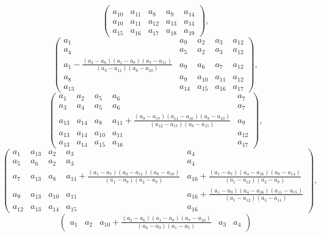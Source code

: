 \documentclass{article}
\begin{document}
\begin{enumerate}[1.]
\[\begin{pmatrix}
\\
 a_{10} & a_{11} & a_{8} & a_{9} & a_{14} 
\\
 a_{10} & a_{11} & a_{12} & a_{13} & a_{14} 
\\
 a_{15} & a_{16} & a_{17} & a_{18} & a_{19} 
\end{pmatrix},
\]
\[
\begin{pmatrix}
  a_{1} & a_{9} & a_{2} & a_{3} & a_{12} 
\\
 a_{4} & a_{5} & a_{2} & a_{3} & a_{12} 
\\
 a_{1}-\frac{\left(a_{2}-a_{6}\right) \left(a_{1}-a_{8}\right) \left(a_{7}-a_{11}\right)}{\left(a_{3}-a_{11}\right) \left(a_{6}-a_{10}\right)} & a_{9} & a_{6} & a_{7} & a_{12} 
\\
 a_{8} & a_{9} & a_{10} & a_{11} & a_{12} 
\\
 a_{13} & a_{14} & a_{15} & a_{16} & a_{17} 
\end{pmatrix},
\]
\[
\begin{pmatrix}
a_{1} & a_{2} & a_{5} & a_{6} & a_{7} 
\\
 a_{3} & a_{4} & a_{5} & a_{6} & a_{7} 
\\
 a_{13} & a_{14} & a_{8} & a_{11}+\frac{\left(a_{9}-a_{17}\right) \left(a_{11}-a_{16}\right) \left(a_{8}-a_{10}\right)}{\left(a_{12}-a_{17}\right) \left(a_{8}-a_{15}\right)} & a_{9} 
\\
 a_{13} & a_{14} & a_{10} & a_{11} & a_{12} 
\\
 a_{13} & a_{14} & a_{15} & a_{16} & a_{17}    
\end{pmatrix},
\]
\[
\begin{pmatrix}
a_{1} & a_{13} & a_{2} & a_{3} & a_{4} 
\\
 a_{5} & a_{6} & a_{2} & a_{3} & a_{4} 
\\
 a_{7} & a_{13} & a_{8} & a_{11}+\frac{\left(a_{1}-a_{7}\right) \left(a_{3}-a_{11}\right) \left(a_{8}-a_{10}\right)}{\left(a_{1}-a_{9}\right) \left(a_{2}-a_{8}\right)} & a_{16}+\frac{\left(a_{1}-a_{7}\right) \left(a_{4}-a_{16}\right) \left(a_{8}-a_{14}\right)}{\left(a_{1}-a_{12}\right) \left(a_{2}-a_{8}\right)} 
\\
 a_{9} & a_{13} & a_{10} & a_{11} & a_{16}+\frac{\left(a_{1}-a_{9}\right) \left(a_{4}-a_{16}\right) \left(a_{11}-a_{15}\right)}{\left(a_{1}-a_{12}\right) \left(a_{3}-a_{11}\right)} 
\\
 a_{12} & a_{13} & a_{14} & a_{15} & a_{16}    
\end{pmatrix},
\]
\[
\begin{pmatrix}
 a_{1} & a_{2} & a_{10}+\frac{\left(a_{2}-a_{6}\right) \left(a_{1}-a_{8}\right) \left(a_{7}-a_{10}\right)}{\left(a_{6}-a_{9}\right) \left(a_{1}-a_{5}\right)} & a_{3} & a_{4} 

\end{pmatrix}\]
\end{enumerate}
\end{document}
